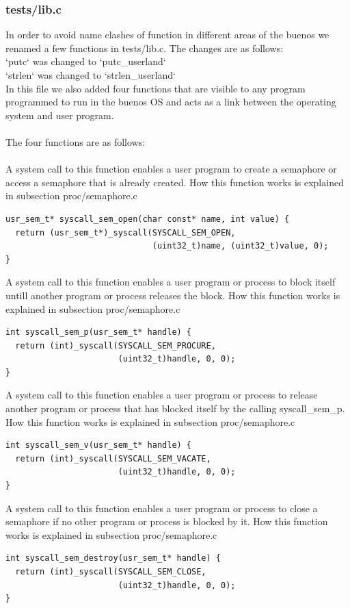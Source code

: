 \documentclass[a4paper,12pt,danish]{report}
\begin{document}
\subsubsection{tests/lib.c}
In order to avoid name clashes of function in different areas of the buenos we renamed a few functions in tests/lib.c. The changes are as follows:
\\
`putc` was changed to `putc\_userland`\\
`strlen` was changed to `strlen\_userland`
\\
In this file we also added four functions that are visible to any program programmed to run in the buenos OS and acts as a link between the operating system and user program.
\\
\\
The four functions are as follows:
\\
\\
A system call to this function enables a user program to create a semaphore or access a semaphore that is already created. How this function works is explained in subsection proc/semaphore.c
\begin{verbatim}
usr_sem_t* syscall_sem_open(char const* name, int value) {
  return (usr_sem_t*)_syscall(SYSCALL_SEM_OPEN,
                              (uint32_t)name, (uint32_t)value, 0);
}
\end{verbatim}
A system call to this function enables a user program or process to block itself untill another program or process releases the block. How this function works is explained in subsection proc/semaphore.c
\begin{verbatim}
int syscall_sem_p(usr_sem_t* handle) {
  return (int)_syscall(SYSCALL_SEM_PROCURE,
                       (uint32_t)handle, 0, 0);
}
\end{verbatim}
A system call to this function enables a user program or process to release another program or process that has blocked itself by the calling syscall\_sem\_p. How this function works is explained in subsection proc/semaphore.c
\begin{verbatim}
int syscall_sem_v(usr_sem_t* handle) {
  return (int)_syscall(SYSCALL_SEM_VACATE,
                       (uint32_t)handle, 0, 0);
}
\end{verbatim}
A system call to this function enables a user program or process to close a semaphore if no other program or process is blocked by it. How this function works is explained in subsection proc/semaphore.c
\begin{verbatim}
int syscall_sem_destroy(usr_sem_t* handle) {
  return (int)_syscall(SYSCALL_SEM_CLOSE,
                       (uint32_t)handle, 0, 0);
}
\end{verbatim}
\end{document}
